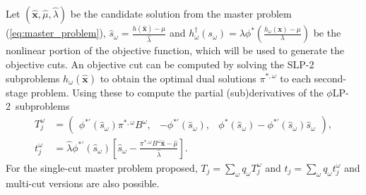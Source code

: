 \documentclass[opre,nonblindrev]{informs3} %
\newcommand{\x}{\mathbf{x}}
\newcommand{\xh}{\hat{\x}}
\newcommand{\lh}{\hat{\lambda}}
\newcommand{\mh}{\hat{\mu}}
\newcommand{\plp}{$\phi$LP-2}
\begin{document}
Let $(\xh,\mh, \lh)$ be the candidate solution from the master problem (\ref{eq:master_problem}), $\hat{s}_\omega = \frac{h(\xh)-\mu}{\lh}$ and $h^\dagger_\omega(s_\omega) = \lambda \phi^*\left(\frac{h_\omega(\x) - \mu}{\lambda}\right)$ be the nonlinear portion of the objective function, which will be used to generate the objective cuts.
An objective cut can be computed by solving the SLP-2 subproblems $h_\omega(\xh)$ to obtain the optimal dual solutions $\pi^{*,\omega}$ to each second-stage problem. Using these to compute the partial (sub)derivatives of the \plp\ subproblems
\begin{align*}
	T_j^\omega & = 
	\left( \begin{array}{ccc}
		\phi^{*\prime}(\hat{s}_\omega) \pi^{*,\omega}B^\omega, 
			 & -\phi^{*\prime}(\hat{s}_\omega), 
			 & \phi^*(\hat{s}_\omega) - \phi^{*\prime}(\hat{s}_\omega) \hat{s}_\omega
	\end{array} \right), \\
	t_j^\omega & = \lh \phi^{*\prime}(\hat{s}_\omega)\left[\hat{s}_\omega - \frac{\pi^{*,\omega}B^\omega\xh - \mh}{\lh}\right].
\end{align*}
For the single-cut master problem proposed, $T_j = \sum_\omega q_\omega T_j^\omega$ and $t_j = \sum_\omega q_\omega t_j^\omega$ and multi-cut versions are also possible. 
\end{document}
